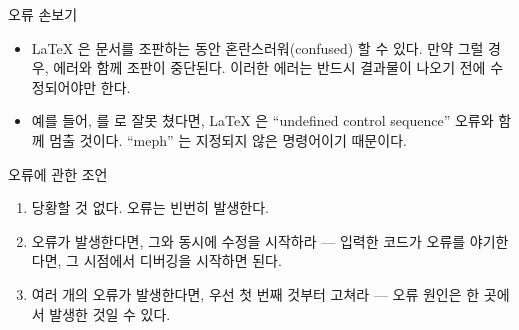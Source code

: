 \documentclass{beamer}
\begin{document}
\begin{frame}[fragile]{오류 손보기}
\begin{itemize}
\item \LaTeX{} 은 문서를 조판하는 동안 혼란스러워(confused) 할 수 있다.
만약 그럴 경우, 에러와 함께 조판이 중단된다. 이러한 에러는 반드시 결과물이 나오기 전에
수정되어야만 한다.
\item 예를 들어,  를  로 잘못 쳤다면, \LaTeX{} 은
``undefined control sequence'' 오류와 함께 멈출 것이다. ``meph'' 는 지정되지 않은
명령어이기 때문이다.
\end{itemize}
\begin{block}{오류에 관한 조언}
\begin{enumerate}
\item 당황할 것 없다. 오류는 빈번히 발생한다.
\item 오류가 발생한다면, 그와 동시에 수정을 시작하라 --- 입력한 코드가 오류를
야기한다면, 그 시점에서 디버깅을 시작하면 된다.
\item 여러 개의 오류가 발생한다면, 우선 첫 번째 것부터 고쳐라 --- 오류 원인은
한 곳에서 발생한 것일 수 있다.
\end{enumerate}
\end{block}
\end{frame}
\end{document}
